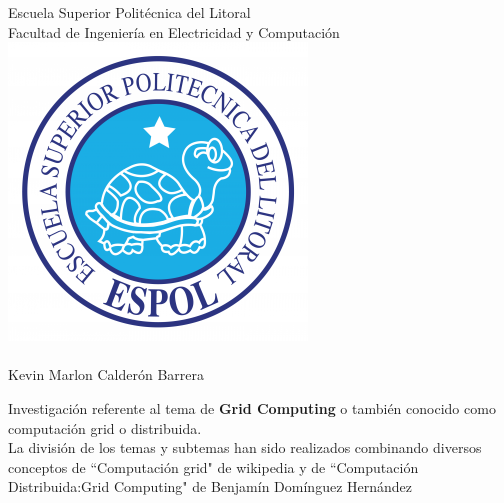 \documentclass[12pt]{article}
\begin{document}
{\centering
{\Large{Escuela Superior Polit\'ecnica del Litoral\\Facultad de Ingenier\'ia en Electricidad y Computaci\'on\\}}
\vspace{0.6in}
\includegraphics[scale=0.5]{espol.png}\\
\vspace{0.8in}
{\LARGE \textbf{\color{blue}{Grid Computing\\ Computaci\'on Distribuida}}\\
\vspace{0.5in}
\large{Kevin Marlon Calder\'on Barrera}
}

\newpage
{\raggedright
Investigaci\'on referente al tema de {\textbf{Grid Computing}} o tambi\'en conocido como computaci\'on grid o distribuida.\\
La divisi\'on de los temas y subtemas han sido realizados combinando diversos conceptos de ``Computaci\'on grid" de wikipedia y de ``Computaci\'on Distribuida:Grid Computing" de Benjam\'in Dom\'inguez Hern\'andez
}
\vspace{-0.2in}
\tableofcontents

\newpage
}
\end{document}
